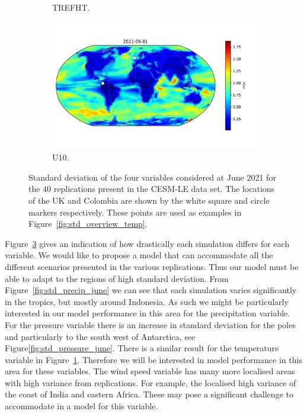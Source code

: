 \begin{figure}[htbp!]
\begin{subfigure}[b]{0.45\textwidth}
		\caption{TREFHT.}
		\label{fig:std_temp_june}   
	\end{subfigure}             
	\begin{subfigure}[b]{0.45\textwidth}
		\includegraphics[width=\textwidth]{U10_std}
		\caption{U10.}
		\label{fig:std_wind_june}
	\end{subfigure}             
	\caption[Spatial overview of variability of Precipitation, Pressure, Temperature, and Wind speed.]{ Standard deviation of the four variables considered at June 2021 for the $40$ replications present in the CESM-LE data set. The locations of the UK and Colombia are shown by the white square and circle markers respectively. These points are used as examples in Figure~\ref{fig:std_overview_temp}. }
	\label{fig:std_overview}
\end{figure}

Figure~\ref{fig:std_overview} gives an indication of how drastically each simulation differs for each variable.
We would like to propose a model that can accommodate all the different scenarios presented in the various replications. 
Thus our model must be able to adapt to the regions of high standard deviation. 
From Figure~\ref{fig:std_precip_june} we can see that each simulation varies significantly in the tropics, but mostly around Indonesia.
As such we might be particularly interested in our model performance in this area for the precipitation variable.
For the pressure variable there is an increase in standard deviation for the poles and particularly to the south west of Antarctica, see Figure\ref{fig:std_pressure_june}.
There is a similar result for the temperature variable in Figure~\ref{fig:std_temp_june}.
Therefore we will be interested in model performance in this area for these variables.
The wind speed variable has many more localised areas with high variance from replications.
For example, the localised high variance of the coast of India and eastern Africa.  
These may pose a significant challenge to accommodate in a model for this variable.

